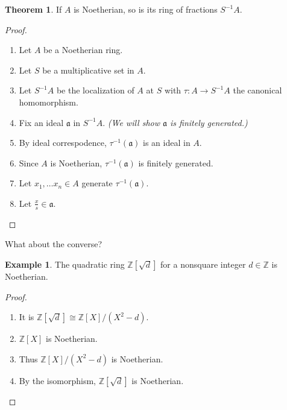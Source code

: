 \documentclass[a4paper]{book}
\theoremstyle{definition}
\newtheorem{example}{Example}[definition]
\newtheorem{theorem}[definition]{Theorem}
\begin{document}
\begin{thmbox}
    \begin{theorem}
        If \(A\) is Noetherian, so is its ring of fractions \(S^{-1}A\).
    \end{theorem}
\end{thmbox}
\begin{proof}
    \begin{enumerate}
        \item Let \(A\) be a Noetherian ring.
        \item Let \(S\) be a multiplicative set in \(A\).
        \item Let \(S^{-1}A\) be the localization of \(A\) at \(S\) with \(\tau: A \longrightarrow S^{-1}A\) the canonical homomorphism.
        \item Fix an ideal \(\mathfrak{a}\) in \(S^{-1}A\). \textit{(We will show \(\mathfrak{a}\) is finitely generated.)}
        \item By ideal correspodence, \(\tau^{-1}(\mathfrak{a})\) is an ideal in \(A\).
        \item Since \(A\) is Noetherian, \(\tau^{-1}(\mathfrak{a})\) is finitely generated.
        \item Let \(x_1, \ldots x_n \in A\) generate \(\tau^{-1}(\mathfrak{a})\).
        \item Let \(\frac{x}{s} \in \mathfrak{a}\).
    \end{enumerate}
\end{proof}

What about the converse?

\begin{example}
    The quadratic ring \(\mathbb{Z}[\sqrt{d}]\) for a nonsquare integer \(d \in \mathbb{Z}\) is Noetherian.
\end{example}
\begin{proof}
    \begin{enumerate}
        \item It is \(\mathbb{Z}[\sqrt{d}] \cong \mathbb{Z}[X] / (X^2 - d)\).
        \item \(\mathbb{Z}[X]\) is Noetherian.
        \item Thus \(\mathbb{Z}[X] / (X^2 - d)\) is Noetherian.
        \item By the isomorphism, \(\mathbb{Z}[\sqrt{d}]\) is Noetherian.
    \end{enumerate}
\end{proof}
\end{document}
